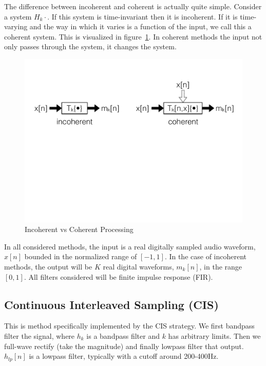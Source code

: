 \documentclass [11pt, proquest,oneside] {ganter_thesis}[2015/03/03]
\begin{document}
The difference between incoherent and coherent is actually quite simple.  Consider a system $H_k{\cdot}$.  If this system is time-invariant then it is incoherent.  If it is time-varying and the way in which it varies is a function of the input, we call this a coherent system.  This is visualized in figure~\ref{fig:incoherent_vs_coherent}.  In coherent methods the input not only passes through the system, it changes the system.

\begin{figure}[!ht]
  \centering
    \includegraphics[width=1\textwidth]{incoherent_vs_coherent}   
    \caption{Incoherent vs Coherent Processing}\label{fig:incoherent_vs_coherent}
\end{figure}

In all considered methods, the input is a real digitally sampled audio waveform, $x[n]$ bounded in the normalized range of $[-1, 1]$.  In the case of incoherent methods, the output will be $K$ real digital waveforms, $m_k[n]$, in the range $[0, 1]$.  All filters considered will be finite impulse response (FIR).

\subsection{Continuous Interleaved Sampling (CIS)}

This is method specifically implemented by the CIS strategy.  We first bandpass filter the signal, where $h_k$ is a bandpass filter and $k$ has arbitrary limits.  Then we full-wave rectify (take the magnitude) and finally lowpass filter that output.  $h_{lp}[n]$ is a lowpass filter, typically with a cutoff around 200-400Hz.
\end{document}
